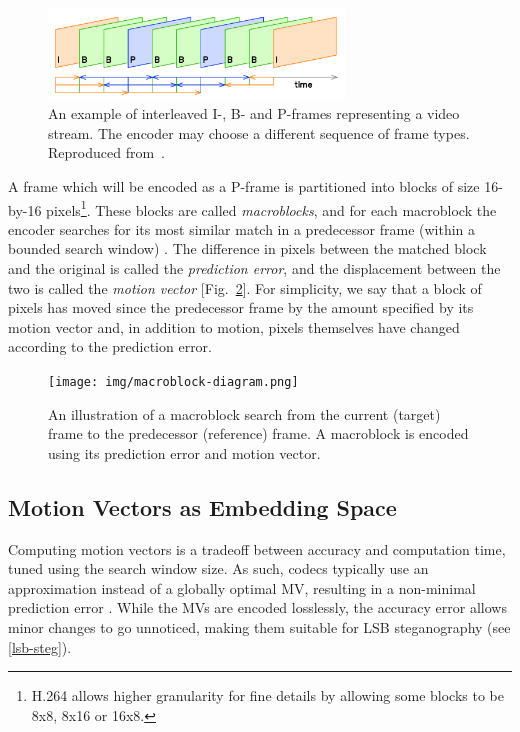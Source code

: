 \documentclass[12pt,british,twoside,notitlepage,usenames,dvipsnames,hypens,final]{report}
\numberwithin{equation}{section}
\numberwithin{figure}{section}
\begin{document}
\begin{figure}[tbh]
\centerline{\includegraphics[width=0.7\textwidth, height=0.7\textheight, keepaspectratio]{img/IPB_images_sequence.png}}
\caption{An example of interleaved I-, B- and P-frames representing a video stream. The encoder may choose a different sequence of frame types. Reproduced from~\cite{interframe-wiki}.}
\label{fig:ipb-seq}
\end{figure}

A frame which will be encoded as a P-frame is partitioned into blocks of size 16-by-16 pixels\footnote{H.264 allows higher granularity for fine details by allowing some blocks to be 8x8, 8x16 or 16x8.}. These blocks are called \emph{macroblocks}, and for each macroblock the encoder searches for its most similar match in a predecessor frame (within a bounded search window) \cite[p.~256]{richardson2004h}. The difference in pixels between the matched block and the original is called the \emph{prediction error}, and the displacement between the two is called the \emph{motion vector} [Fig.~\ref{fig:mb-search}]. For simplicity, we say that a block of pixels has moved since the predecessor frame by the amount specified by its motion vector and, in addition to motion, pixels themselves have changed according to the prediction error.

\begin{figure}[tbh]
\centerline{\texttt{[image: img/macroblock-diagram.png]}}
\caption{An illustration of a macroblock search from the current (target) frame to the predecessor (reference) frame. A macroblock is encoded using its prediction error and  motion vector.}
\label{fig:mb-search}
\end{figure} 

\subsection{Motion Vectors as Embedding Space}
\label{mv-emb-space}

Computing motion vectors is a tradeoff between accuracy and computation time, tuned using the search window size. As such, codecs typically use an approximation instead of a globally optimal MV, resulting in a non-minimal prediction error \cite[p.~257]{richardson2004h}. While the MVs are encoded losslessly, the accuracy error allows minor changes to go unnoticed, making them suitable for LSB steganography (see \ref{lsb-steg}).
\end{document}
